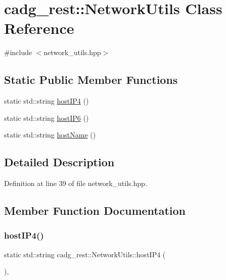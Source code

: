 \hypertarget{classcadg__rest_1_1_network_utils}{}\section{cadg\+\_\+rest\+::Network\+Utils Class Reference}
\label{classcadg__rest_1_1_network_utils}


{\ttfamily \#include $<$network\+\_\+utils.\+hpp$>$}

\subsection*{Static Public Member Functions}
\begin{DoxyCompactItemize}
\item 
static std\+::string \mbox{\hyperlink{classcadg__rest_1_1_network_utils_ac8093c0b7c4ce8a9deab5febb872b894}{host\+I\+P4}} ()
\item 
static std\+::string \mbox{\hyperlink{classcadg__rest_1_1_network_utils_ab398011818d40b7f7fb040e755decc86}{host\+I\+P6}} ()
\item 
static std\+::string \mbox{\hyperlink{classcadg__rest_1_1_network_utils_a94f6fe4c9c074cf4e52d8ad80e46ce5b}{host\+Name}} ()
\end{DoxyCompactItemize}


\subsection{Detailed Description}


Definition at line 39 of file network\+\_\+utils.\+hpp.



\subsection{Member Function Documentation}
\mbox{\label{classcadg__rest_1_1_network_utils_ac8093c0b7c4ce8a9deab5febb872b894}} 
\subsubsection{\texorpdfstring{hostIP4()}{hostIP4()}}
{\footnotesize\ttfamily static std\+::string cadg\+\_\+rest\+::\+Network\+Utils\+::host\+I\+P4 (\begin{DoxyParamCaption}{ }\end{DoxyParamCaption})\hspace{0.3cm}{\ttfamily [inline]}, {\ttfamily [static]}}



